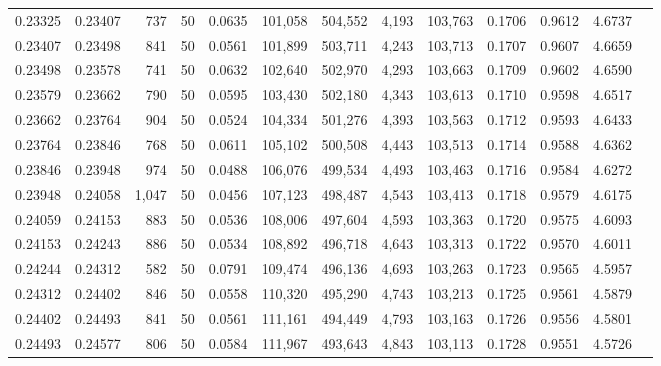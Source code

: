 \begin{tabular}{rrrrrrrrrrrrr}
0.23325 & 0.23407 &   737 &  50 &                                     0.0635 & 101,058 & 504,552 &   4,193 & 103,763 & 0.1706 & 0.9612 & 4.6737 \\
0.23407 & 0.23498 &   841 &  50 &                                     0.0561 & 101,899 & 503,711 &   4,243 & 103,713 & 0.1707 & 0.9607 & 4.6659 \\
0.23498 & 0.23578 &   741 &  50 &                                     0.0632 & 102,640 & 502,970 &   4,293 & 103,663 & 0.1709 & 0.9602 & 4.6590 \\
0.23579 & 0.23662 &   790 &  50 &                                     0.0595 & 103,430 & 502,180 &   4,343 & 103,613 & 0.1710 & 0.9598 & 4.6517 \\
0.23662 & 0.23764 &   904 &  50 &                                     0.0524 & 104,334 & 501,276 &   4,393 & 103,563 & 0.1712 & 0.9593 & 4.6433 \\
0.23764 & 0.23846 &   768 &  50 &                                     0.0611 & 105,102 & 500,508 &   4,443 & 103,513 & 0.1714 & 0.9588 & 4.6362 \\
0.23846 & 0.23948 &   974 &  50 &                                     0.0488 & 106,076 & 499,534 &   4,493 & 103,463 & 0.1716 & 0.9584 & 4.6272 \\
0.23948 & 0.24058 & 1,047 &  50 &                                     0.0456 & 107,123 & 498,487 &   4,543 & 103,413 & 0.1718 & 0.9579 & 4.6175 \\
0.24059 & 0.24153 &   883 &  50 &                                     0.0536 & 108,006 & 497,604 &   4,593 & 103,363 & 0.1720 & 0.9575 & 4.6093 \\
0.24153 & 0.24243 &   886 &  50 &                                     0.0534 & 108,892 & 496,718 &   4,643 & 103,313 & 0.1722 & 0.9570 & 4.6011 \\
0.24244 & 0.24312 &   582 &  50 &                                     0.0791 & 109,474 & 496,136 &   4,693 & 103,263 & 0.1723 & 0.9565 & 4.5957 \\
0.24312 & 0.24402 &   846 &  50 &                                     0.0558 & 110,320 & 495,290 &   4,743 & 103,213 & 0.1725 & 0.9561 & 4.5879 \\
0.24402 & 0.24493 &   841 &  50 &                                     0.0561 & 111,161 & 494,449 &   4,793 & 103,163 & 0.1726 & 0.9556 & 4.5801 \\
0.24493 & 0.24577 &   806 &  50 &                                     0.0584 & 111,967 & 493,643 &   4,843 & 103,113 & 0.1728 & 0.9551 & 4.5726 \\

\end{tabular}
